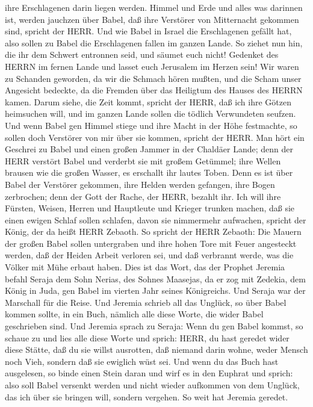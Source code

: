 ihre Erschlagenen darin liegen werden.  Himmel und Erde und
alles was darinnen ist, werden jauchzen über Babel, daß ihre Verstörer
von Mitternacht gekommen sind, spricht der HERR.  Und wie
Babel in Israel die Erschlagenen gefällt hat, also sollen zu Babel die
Erschlagenen fallen im ganzen Lande.  So ziehet nun hin,
die ihr dem Schwert entronnen seid, und säumet euch nicht! Gedenket des
HERRN im fernen Lande und lasset euch Jerusalem im Herzen sein!
 Wir waren zu Schanden geworden, da wir die Schmach hören
mußten, und die Scham unser Angesicht bedeckte, da die Fremden über das
Heiligtum des Hauses des HERRN kamen.  Darum siehe, die
Zeit kommt, spricht der HERR, daß ich ihre Götzen heimsuchen will, und
im ganzen Lande sollen die tödlich Verwundeten seufzen. 
Und wenn Babel gen Himmel stiege und ihre Macht in der Höhe festmachte,
so sollen doch Verstörer von mir über sie kommen, spricht der HERR.
 Man hört ein Geschrei zu Babel und einen großen Jammer in
der Chaldäer Lande;  denn der HERR verstört Babel und
verderbt sie mit großem Getümmel; ihre Wellen brausen wie die großen
Wasser, es erschallt ihr lautes Toben.  Denn es ist über
Babel der Verstörer gekommen, ihre Helden werden gefangen, ihre Bogen
zerbrochen; denn der Gott der Rache, der HERR, bezahlt ihr.
 Ich will ihre Fürsten, Weisen, Herren und Hauptleute und
Krieger trunken machen, daß sie einen ewigen Schlaf sollen schlafen,
davon sie nimmermehr aufwachen, spricht der König, der da heißt HERR
Zebaoth.  So spricht der HERR Zebaoth: Die Mauern der
großen Babel sollen untergraben und ihre hohen Tore mit Feuer angesteckt
werden, daß der Heiden Arbeit verloren sei, und daß verbrannt werde, was
die Völker mit Mühe erbaut haben.  Dies ist das Wort, das
der Prophet Jeremia befahl Seraja dem Sohn Nerias, des Sohnes Maasejas,
da er zog mit Zedekia, dem König in Juda, gen Babel im vierten Jahr
seines Königreichs. Und Seraja war der Marschall für die Reise.
 Und Jeremia schrieb all das Unglück, so über Babel kommen
sollte, in ein Buch, nämlich alle diese Worte, die wider Babel
geschrieben sind.  Und Jeremia sprach zu Seraja: Wenn du
gen Babel kommst, so schaue zu und lies alle diese Worte 
und sprich: HERR, du hast geredet wider diese Stätte, daß du sie willst
ausrotten, daß niemand darin wohne, weder Mensch noch Vieh, sondern daß
sie ewiglich wüst sei.  Und wenn du das Buch hast
ausgelesen, so binde einen Stein daran und wirf es in den Euphrat
 und sprich: also soll Babel versenkt werden und nicht
wieder aufkommen von dem Unglück, das ich über sie bringen will, sondern
vergehen. So weit hat Jeremia geredet.

